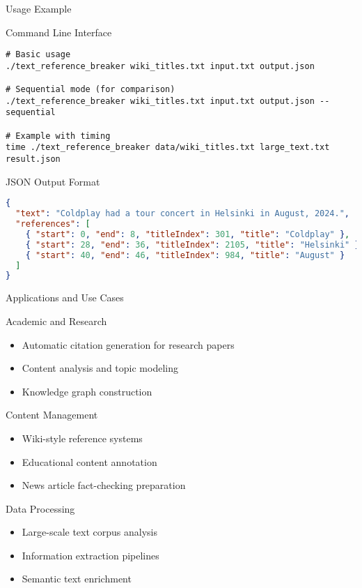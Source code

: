 \documentclass[aspectratio=169]{beamer}
\begin{document}
\begin{frame}[fragile]{Usage Example}
\begin{block}{Command Line Interface}
\begin{verbatim}
# Basic usage
./text_reference_breaker wiki_titles.txt input.txt output.json

# Sequential mode (for comparison)
./text_reference_breaker wiki_titles.txt input.txt output.json --sequential

# Example with timing
time ./text_reference_breaker data/wiki_titles.txt large_text.txt result.json
\end{verbatim}
\end{block}

\begin{block}{JSON Output Format}
\begin{lstlisting}[language=json, basicstyle=\tiny\ttfamily]
{
  "text": "Coldplay had a tour concert in Helsinki in August, 2024.",
  "references": [
    { "start": 0, "end": 8, "titleIndex": 301, "title": "Coldplay" },
    { "start": 28, "end": 36, "titleIndex": 2105, "title": "Helsinki" },
    { "start": 40, "end": 46, "titleIndex": 984, "title": "August" }
  ]
}
\end{lstlisting}
\end{block}
\end{frame}

\begin{frame}{Applications and Use Cases}
\begin{block}{Academic and Research}
\begin{itemize}
    \item Automatic citation generation for research papers
    \item Content analysis and topic modeling
    \item Knowledge graph construction
\end{itemize}
\end{block}

\begin{block}{Content Management}
\begin{itemize}
    \item Wiki-style reference systems
    \item Educational content annotation
    \item News article fact-checking preparation
\end{itemize}
\end{block}

\begin{block}{Data Processing}
\begin{itemize}
    \item Large-scale text corpus analysis
    \item Information extraction pipelines
    \item Semantic text enrichment
\end{itemize}
\end{block}
\end{frame}
\end{document}
